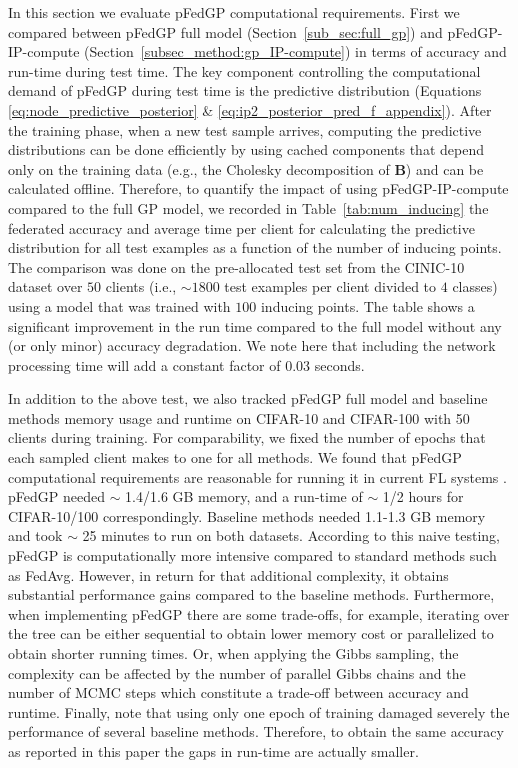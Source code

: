 \documentclass{article}
\def\Secref#1{Section~\ref{#1}}
\def\rmB{{\mathbf{B}}}
\newcommand{\tblref}[1]{Table~\ref{#1}}
\begin{document}
In this section we evaluate pFedGP computational requirements.
First we compared between pFedGP full model (\Secref{sub_sec:full_gp}) and pFedGP-IP-compute  (\Secref{subsec_method:gp_IP-compute}) in terms of accuracy and run-time during test time. The key component controlling the computational demand of pFedGP during test time is the predictive distribution (Equations \ref{eq:node_predictive_posterior} \& \ref{eq:ip2_posterior_pred_f_appendix}). After the training phase, when a new test sample arrives, computing the predictive distributions can be done efficiently by using cached components that depend only on the training data (e.g., the Cholesky decomposition of $\rmB$) and can be calculated offline. Therefore, to quantify the impact of using pFedGP-IP-compute compared to the full GP model, we recorded in \tblref{tab:num_inducing} the federated accuracy and average time per client for calculating the predictive distribution for all test examples as a function of the number of inducing points. The comparison was done on the pre-allocated test set from the CINIC-10 dataset over $50$ clients (i.e., $\sim 1800$ test examples per client divided to $4$ classes) using a model that was trained with $100$ inducing points. The table shows a significant improvement in the run time compared to the full model without any (or only minor) accuracy degradation. We note here that including the network processing time will add a constant factor of $0.03$ seconds.

In addition to the above test, we also tracked pFedGP full model and baseline methods memory usage and runtime on CIFAR-10 and CIFAR-100 with 50 clients during training. For comparability, we fixed the number of epochs that each sampled client makes to one for all methods. We found that pFedGP computational requirements are reasonable for running it in current FL systems \cite{cai2021towards}. 
pFedGP needed $\sim$ 1.4/1.6 GB memory, and a run-time of $\sim$ 1/2 hours for CIFAR-10/100 correspondingly. Baseline methods needed 1.1-1.3 GB memory and took $\sim$ 25 minutes to run on both datasets. According to this naive testing, pFedGP is computationally more intensive compared to standard methods such as FedAvg. However, in return for that additional complexity, it obtains substantial performance gains compared to the baseline methods. Furthermore, when implementing pFedGP there are some trade-offs, for example, iterating over the tree can be either sequential to obtain lower memory cost or parallelized to obtain shorter running times. Or, when applying the Gibbs sampling, the complexity can be affected by the number of parallel Gibbs chains and the number of MCMC steps which constitute a trade-off between accuracy and runtime. Finally, note that using only one epoch of training damaged severely the performance of several baseline methods. Therefore, to obtain the same accuracy as reported in this paper the gaps in run-time are actually smaller.
\end{document}
